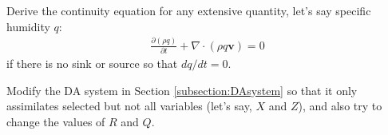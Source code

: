 \begin{Exercise}
Derive the continuity equation for any extensive quantity, let's say specific humidity $q$:
\begin{align*}
\frac{\partial (\rho q)}{\partial t} + \nabla \cdot(\rho q \textbf{v}) = 0
\end{align*}
if there is no sink or source so that $dq/dt=0$.
\end{Exercise}

\begin{Exercise}
Modify the DA system in Section \ref{subsection:DAsystem} so that it only assimilates selected but not all variables (let's say, $X$ and $Z$), and also try to change the values of $R$ and $Q$.
\end{Exercise}